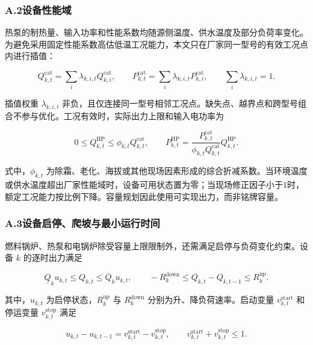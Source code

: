 \subsubsection*{A.2\quad 设备性能域}

热泵的制热量、输入功率和性能系数均随源侧温度、供水温度及部分负荷率变化。为避免采用固定性能系数高估低温工况能力，本文只在厂家同一型号的有效工况点内进行插值：

\begin{equation}
Q_{k,t}^{\mathrm{cat}}=\sum_i\lambda_{k,i,t}Q_{k,i}^{\mathrm{cat}},
\qquad
P_{k,t}^{\mathrm{cat}}=\sum_i\lambda_{k,i,t}P_{k,i}^{\mathrm{cat}},
\qquad
\sum_i\lambda_{k,i,t}=1.
\label{eq:performance_interpolation}
\end{equation}

插值权重 $\lambda_{k,i,t}$ 非负，且仅连接同一型号相邻工况点。缺失点、越界点和跨型号组合不参与优化。工况有效时，实际出力上限和输入电功率为

\begin{equation}
0\leq Q_{k,t}^{\mathrm{HP}}\leq\phi_{k,t}Q_{k,t}^{\mathrm{cat}},
\qquad
P_{k,t}^{\mathrm{HP}}
=\frac{P_{k,t}^{\mathrm{cat}}}{\phi_{k,t}Q_{k,t}^{\mathrm{cat}}}Q_{k,t}^{\mathrm{HP}}.
\label{eq:performance_limit}
\end{equation}

式中，$\phi_{k,t}$ 为除霜、老化、海拔或其他现场因素形成的综合折减系数。当环境温度或供水温度超出厂家性能域时，设备可用状态置为零；当现场修正因子小于1时，额定工况能力按比例下降。容量规划因此使用可实现出力，而非铭牌容量。

\subsubsection*{A.3\quad 设备启停、爬坡与最小运行时间}

燃料锅炉、热泵和电锅炉除受容量上限限制外，还需满足启停与负荷变化约束。设备 $k$ 的逐时出力满足

\begin{equation}
\underline Q_ku_{k,t}\leq Q_{k,t}\leq \overline Q_ku_{k,t},
\qquad
-R_k^{\mathrm{down}}\leq Q_{k,t}-Q_{k,t-1}\leq R_k^{\mathrm{up}}.
\label{eq:ramp_limit}
\end{equation}

其中，$u_{k,t}$ 为启停状态，$R_k^{\mathrm{up}}$ 与 $R_k^{\mathrm{down}}$ 分别为升、降负荷速率。启动变量 $v_{k,t}^{\mathrm{start}}$ 和停运变量 $v_{k,t}^{\mathrm{stop}}$ 满足

\begin{equation}
u_{k,t}-u_{k,t-1}=v_{k,t}^{\mathrm{start}}-v_{k,t}^{\mathrm{stop}},
\qquad
v_{k,t}^{\mathrm{start}}+v_{k,t}^{\mathrm{stop}}\leq1.
\label{eq:startup_logic}
\end{equation}

